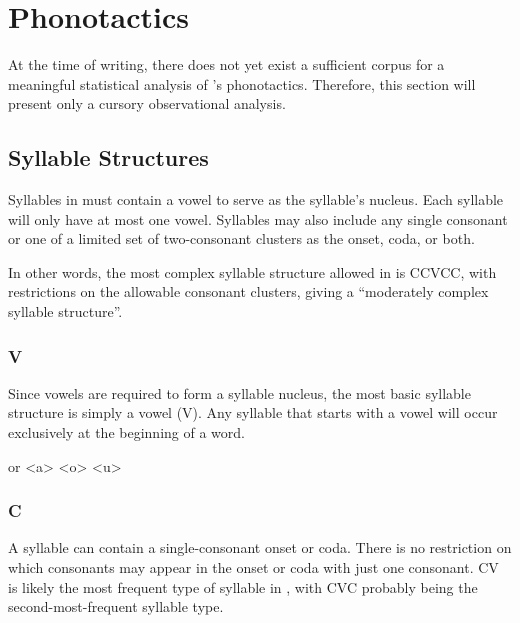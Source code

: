 \section{Phonotactics}
\label{sec:tvk-phonotactics}

At the time of writing, there does not yet exist a sufficient corpus for a meaningful statistical analysis of \langtvk's phonotactics. Therefore, this section will present only a cursory observational analysis.

\subsection{Syllable Structures}
\label{subsec:tvk-syll-struc}

Syllables in \langtvk{} must contain a vowel to serve as the syllable's nucleus. Each syllable will only have at most one vowel. Syllables may also include any single consonant or one of a limited set of two-consonant clusters as the onset, coda, or both.

In other words, the most complex syllable structure allowed in \langtvk{} is CCVCC, with restrictions on the allowable consonant clusters, giving \langtvk{} a \enquote{moderately complex syllable structure}.\autocite{wals-12}

\subsubsection{V}

Since vowels are required to form a syllable nucleus, the most basic syllable structure is simply a vowel (V). Any syllable that starts with a vowel will occur exclusively at the beginning of a word.

	     or 
	\a<e2>    
	    
	    
	    
\xe

\subsubsection{C}

A syllable can contain a single-consonant onset or coda. There is no restriction on which consonants may appear in the onset or coda with just one consonant. CV is likely the most frequent type of syllable in \langtvk, with CVC probably being the second-most-frequent syllable type.

